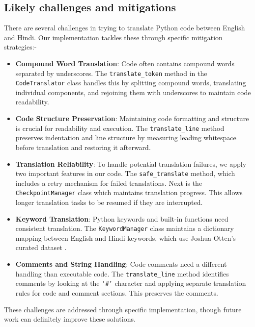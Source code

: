 \documentclass[11pt,a4paper]{article}
\begin{document}
            \subsection{Likely challenges and mitigations} 
            There are several challenges in trying to translate Python code between English and Hindi. Our implementation tackles these through specific mitigation strategies:-
            \begin{itemize}[itemsep=0pt, topsep=0pt]
              \item \textbf{Compound Word Translation}: Code often contains compound words separated by underscores. The \texttt{translate\_token} method in the \texttt{CodeTranslator} class handles this by splitting compound words, translating individual components, and rejoining them with underscores to maintain code readability.
              \item \textbf{Code Structure Preservation}: Maintaining code formatting and structure is crucial for readability and execution. The \texttt{translate\_line} method preserves indentation and line structure by measuring leading whitespace before translation and restoring it afterward.
              \item \textbf{Translation Reliability}: To handle potential translation failures, we apply two important features in our code. The \texttt{safe\_translate} method, which includes a retry mechanism for failed translations. Next is the \texttt{CheckpointManager} class which maintains translation progress. This allows longer translation tasks to be resumed if they are interrupted.
              \item \textbf{Keyword Translation}: Python keywords and built-in functions need consistent translation. The \texttt{KeywordManager} class maintains a dictionary mapping between English and Hindi keywords, which use Joshua Otten's curated dataset \cite{otten-etal-23-unipy}.
              \item \textbf{Comments and String Handling}: Code comments need a different handling than executable code. The \texttt{translate\_line} method identifies comments by looking at the \texttt{'\#'} character and applying separate translation rules for code and comment sections. This preserves the comments. 
            \end{itemize}
            These challenges are addressed through specific implementation, though future work can definitely improve these solutions.
\end{document}
